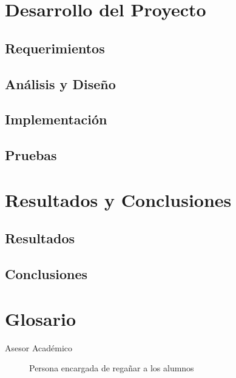 \documentclass[12pt,letterpaper,spanish]{report}
\begin{document}
\chapter{Desarrollo del Proyecto}
\newpage

\section{Requerimientos}

\section{Análisis y Diseño}

\section{Implementación}

\section{Pruebas}



\chapter{Resultados y Conclusiones}
\newpage

\section{Resultados}


\section{Conclusiones}



\newpage

\appendix

%







\newpage
\chapter{Glosario}

\begin{description}
  \item[Asesor Académico] Persona encargada de regañar a los alumnos
\end{description}

\end{document}
